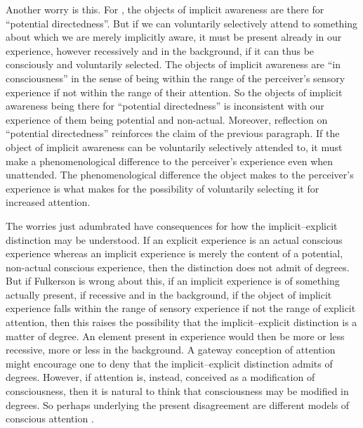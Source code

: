 Another worry is this. For \citet[95]{Fulkerson:2014ek}, the objects of implicit awareness are there for ``potential directedness''. But if we can voluntarily selectively attend to something about which we are merely implicitly aware, it must be present already in our experience, however recessively and in the background, if it can thus be consciously and voluntarily selected. The objects of implicit awareness are ``in consciousness'' in the sense of being within the range of the perceiver's sensory experience if not within the range of their attention. So the objects of implicit awareness being there for ``potential directedness'' is inconsistent with our experience of them being potential and non-actual. Moreover, reflection on ``potential directedness'' reinforces the claim of the previous paragraph. If the object of implicit awareness can be voluntarily selectively attended to, it must make a phenomenological difference to the perceiver's experience even when unattended. The phenomenological difference the object makes to the perceiver's experience is what makes for the possibility of voluntarily selecting it for increased attention.

The worries just adumbrated have consequences for how the implicit--explicit distinction may be understood. If an explicit experience is an actual conscious experience whereas an implicit experience is merely the content of a potential, non-actual conscious experience, then the distinction does not admit of degrees. But if Fulkerson is wrong about this, if an implicit experience is of something actually present, if recessive and in the background, if the object of implicit experience falls within the range of sensory experience if not the range of explicit attention, then this raises the possibility that the implicit--explicit distinction is a matter of degree. An element present in experience would then be more or less recessive, more or less in the background. A gateway conception of attention might encourage one to deny that the implicit--explicit distinction admits of degrees. However, if attention is, instead, conceived as a modification of consciousness, then it is natural to think that consciousness may be modified in degrees. So perhaps underlying the present disagreement are different  models of conscious attention \citep[see][for an excellent recent discussion of attention]{Wu:2014aa}.

